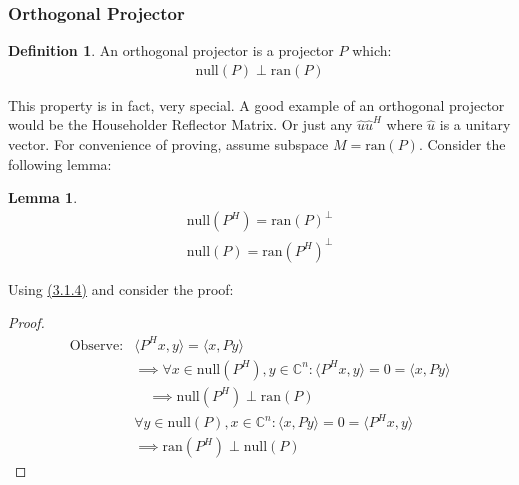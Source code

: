 \documentclass[]{article}
\theoremstyle{definition}
\newtheorem{lemma}{Lemma}[subsection]    %
\newtheorem{definition}{Definition}
\begin{document}
        \subsubsection{Orthogonal Projector}
            \begin{definition}
                An orthogonal projector is a projector $P$ which: 
                \begin{align}
                    \text{null}(P) \perp \text{ran}(P)
                \end{align}    
            \end{definition}
            This property is in fact, very special. A good example of an orthogonal projector would be the Householder Reflector Matrix. Or just any $\hat{u}\hat{u}^H$ where $\hat{u}$ is a unitary vector. For convenience of proving, assume subspace $M = \text{ran}(P)$. Consider the following lemma: 
            \begin{lemma}
                \begin{align}
                    \text{null}(P^H) = \text{ran}(P)^{\perp}
                    \\
                    \text{null}(P) = \text{ran}(P^H)^{\perp}
                \end{align}
            \end{lemma}
            \noindent
            Using \hyperref[3.1.4]{(3.1.4)} and consider the proof: 
            \begin{proof}
                \begin{align}
                    \text{Observe}: &
                    \langle P^Hx, y\rangle = \langle x, Py\rangle 
                    \\
                    & \implies \forall  x \in \text{null}(P^H), y\in \mathbb{C}^n: \langle P^Hx ,y\rangle = 0 = \langle x, Py\rangle
                    \\
                    &\quad 
                    \implies \text{null}(P^H) \perp \text{ran}(P)
                    \\
                    & \forall y \in \text{null}(P), x \in \mathbb{C}^n: \langle x, Py\rangle = 0 = \langle P^Hx, y\rangle
                    \\
                    & \implies \text{ran}(P^H) \perp \text{null}(P)
                \end{align}
            \end{proof}
            
\end{document}
